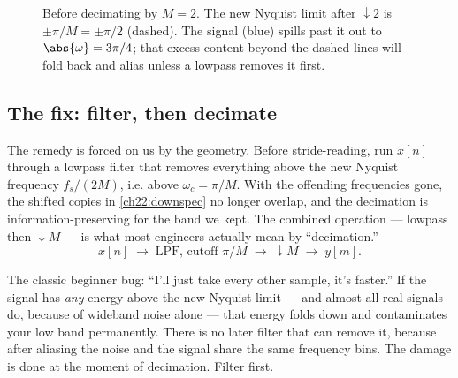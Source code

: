 \begin{figure}[H]
\centering
{}
\caption{Before decimating by $M=2$. The new Nyquist limit after $\downarrow 2$
is $\pm\pi/M=\pm\pi/2$ (dashed). The signal (blue) spills past it out to
$\abs{\omega}=3\pi/4$; that excess content beyond the dashed lines will fold
back and alias unless a lowpass removes it first.}
\label{ch22:fig-predec}
\end{figure}

\subsection{The fix: filter, then decimate}

The remedy is forced on us by the geometry. Before stride-reading, run $x[n]$
through a lowpass filter that removes everything above the new Nyquist frequency
$f_s/(2M)$, i.e. above $\omega_c = \pi/M$. With the offending frequencies gone,
the shifted copies in \eqref{ch22:downspec} no longer overlap, and the
decimation is information-preserving for the band we kept. The combined
operation --- lowpass then $\downarrow M$ --- is what most engineers actually
mean by ``decimation.''
\begin{equation}
  x[n] \;\longrightarrow\; \boxed{\text{LPF, cutoff } \pi/M}
  \;\longrightarrow\; \boxed{\downarrow M} \;\longrightarrow\; y[m].
  \label{ch22:decimchain}
\end{equation}

\begin{trapbox}
The classic beginner bug: ``I'll just take every other sample, it's faster.'' If
the signal has \emph{any} energy above the new Nyquist limit --- and almost all
real signals do, because of wideband noise alone --- that energy folds down and
contaminates your low band permanently. There is no later filter that can remove
it, because after aliasing the noise and the signal share the same frequency
bins. The damage is done at the moment of decimation. Filter first.
\end{trapbox}

